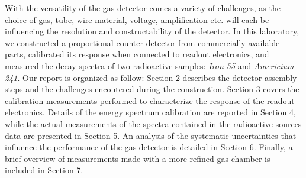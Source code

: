 With the versatility of the gas detector comes a variety of challenges, as the choice of gas, tube, wire material, voltage, amplification etc. will each be influencing the resolution and constructability of the detector. In this laboratory, we constructed a proportional counter detector from commercially available parts, calibrated its response when connected to readout electronics, and measured the decay spectra of two radioactive samples: \emph{Iron-55} and \emph{Americium-241}. Our report is organized as follow: Section 2 describes the detector assembly steps and the challenges encoutered during the construction. Section 3 covers the calibration measurements performed to characterize the response of the readout electronics. Details of the energy spectrum calibration are reported in Section 4, while the actual measurements of the spectra contained in the radioactive sources data are presented in Section 5. An analysis of the systematic uncertainties that influence the performance of the gas detector is detailed in Section 6. Finally, a brief overview of measurements made with a more refined gas chamber is included in Section 7.